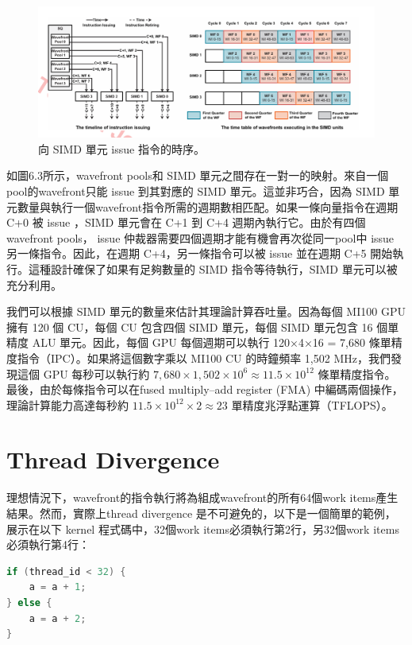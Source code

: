 \begin{figure}
    \centering
    \includegraphics[width=1\linewidth]{FileAusiliari//Screenshots/Figure6-3.png}
    \caption{向 SIMD 單元 issue 指令的時序。}
    \label{fig:enter-label}
\end{figure}

如圖6.3所示，wavefront pools和 SIMD 單元之間存在一對一的映射。來自一個pool的wavefront只能 issue 到其對應的 SIMD 單元。這並非巧合，因為 SIMD 單元數量與執行一個wavefront指令所需的週期數相匹配。如果一條向量指令在週期 C+0 被 issue ，SIMD 單元會在 C+1 到 C+4 週期內執行它。由於有四個wavefront pools， issue 仲裁器需要四個週期才能有機會再次從同一pool中 issue 另一條指令。因此，在週期 C+4，另一條指令可以被 issue 並在週期 C+5 開始執行。這種設計確保了如果有足夠數量的 SIMD 指令等待執行，SIMD 單元可以被充分利用。

我們可以根據 SIMD 單元的數量來估計其理論計算吞吐量。因為每個 MI100 GPU 擁有 120 個 CU，每個 CU 包含四個 SIMD 單元，每個 SIMD 單元包含 16 個單精度 ALU 單元。因此，每個 GPU 每個週期可以執行 120×4×16 = 7,680 條單精度指令（IPC）。如果將這個數字乘以 MI100 CU 的時鐘頻率 1,502 MHz，我們發現這個 GPU 每秒可以執行約 $7,680 \times 1,502 \times 10^6 \approx 11.5 \times 10^{12}$
 條單精度指令。最後，由於每條指令可以在fused multiply–add register (FMA) 中編碼兩個操作，理論計算能力高達每秒約 $11.5 \times 10^{12} \times 2 \approx 23$ 單精度兆浮點運算（TFLOPS）。

 \section{Thread Divergence}
 理想情況下，wavefront的指令執行將為組成wavefront的所有64個work items產生結果。然而，實際上thread divergence 是不可避免的，以下是一個簡單的範例，展示在以下 kernel 程式碼中，32個work items必須執行第2行，另32個work items必須執行第4行：
\lstset{style=mystyle}
\begin{lstlisting}[language=c++,caption={diverging範例程式碼。}]
if (thread_id < 32) {
    a = a + 1;
} else {
    a = a + 2;
}
\end{lstlisting}

